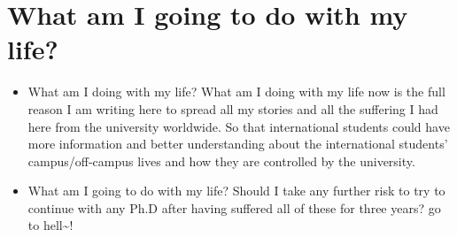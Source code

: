 \documentclass[9pt,b5paper]{article}
\begin{document}
\section{What am I going to do with my life?}
\label{sec-6}
\begin{itemize}
\item What am I doing with my life? What am I doing with my life now is the full reason I am writing here to spread all my stories and all the suffering I had here from the university worldwide. So that international students could have more information and better understanding about the international students' campus/off-campus lives and how they are controlled by the university.
\item What am I going to do with my life? Should I take any further risk to try to continue with any Ph.D after having suffered all of these for three years? go to hell\textasciitilde{}!
\end{itemize}
\end{document}

